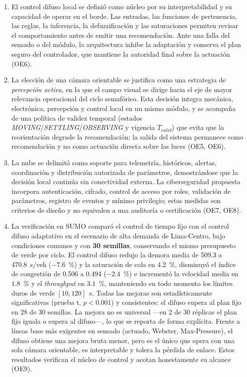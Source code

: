 \begin{enumerate}
\item El control difuso local se definió como núcleo por su interpretabilidad y su capacidad de operar en el
borde. Las entradas, las funciones de pertenencia, las reglas, la inferencia, la defuzzificación y las
saturaciones permiten revisar el comportamiento antes de emitir una recomendación. Ante una falla del
sensado o del módulo, la arquitectura inhibe la adaptación y conserva el plan seguro del controlador, que
mantiene la autoridad final sobre la actuación (OE6).

\item La elección de una cámara orientable se justifica como una estrategia de \emph{percepción activa}, en
la que el campo visual se dirige hacia el eje de mayor relevancia operacional del ciclo semafórico. Esta
decisión integra mecánica, electrónica, percepción y control local en un mismo módulo, y se
acompaña de una política de validez temporal (estados \textit{MOVING}/\textit{SETTLING}/\textit{OBSERVING} y
vigencia $T_{valid}$) que evita que la reorientación degrade la recomendación; la salida del sistema permanece
como recomendación y no como actuación directa sobre las luces (OE5, OE6).

\item La nube se delimitó como soporte para telemetría, históricos, alertas, coordinación y distribución
autorizada de parámetros, demostrándose que la decisión local continúa sin conectividad externa. La
ciberseguridad propuesta incorpora autenticación, cifrado, control de acceso por roles, validación de
parámetros, registro de eventos y mínimo privilegio; estas medidas son criterios de diseño y no equivalen a
una auditoría o certificación (OE7, OE8).

\item La verificación en SUMO comparó el control de tiempo fijo con el control difuso adaptativo en el
escenario de alta demanda de Lima-Centro, bajo condiciones comunes y con \textbf{30 semillas}, conservando el
mismo presupuesto de verde por ciclo. El control difuso redujo la demora media de 509.3 a 470.8~s/veh
($-7.6$~\%) y la saturación de cola en $4.2$~\%, disminuyó el índice de congestión de 0.506 a 0.494
($-2.4$~\%) e incrementó la velocidad media en $1.8$~\% y el \textit{throughput} en $3.1$~\%, manteniendo en
todo momento los límites duros de verde $[10,120]$~s. Todas las mejoras son estadísticamente significativas
(prueba t, $p<0.001$) y consistentes: el difuso supera al plan fijo en 28 de 30 semillas. La mejora no es
universal —en 2 de 30 réplicas el plan fijo iguala o supera al difuso—, lo que se reporta de forma explícita.
Frente a líneas base más exigentes en sensado (actuado, Webster, Max-Pressure), el difuso obtiene una mejora
bruta menor, pero es el único que opera con una sola cámara orientable, es interpretable y tolera la pérdida
de enlace. Estos resultados verifican el núcleo de control y acotan honestamente su alcance (OE9).


\end{enumerate}
